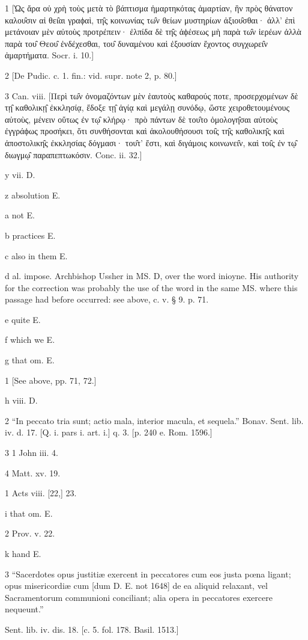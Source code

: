 1
[Ὡς ἄρα οὐ χρὴ τοὺς μετὰ τὸ βάπτισμα ἡμαρτηκότας ἁμαρτίαν, ἣν πρὸς θάνατον καλου̑σιν αἱ θει̑αι γραϕαὶ, τη̑ς κοινωνίας τω̑ν θείων μυστηρίων ἀξιου̑σθαι· ἀλλ’ ἐπὶ μετάνοιαν μὲν αὐτοὺς προτρέπειν· ἐλπίδα δὲ τη̑ς ἀϕέσεως μὴ παρὰ τω̑ν ἱερέων ἀλλὰ παρὰ του̑ Θεου̑ ἐνδέχεσθαι, του̑ δυναμένου καὶ ἐξουσίαν ἔχοντος συγχωρει̑ν ἁμαρτήματα. Socr. i. 10.]

2
[De Pudic. c. 1. fin.: vid. supr. note 2, p. 80.]

3
Can. viii. [Περὶ τω̑ν ὀνομαζόντων μὲν ἑαυτοὺς καθαρούς ποτε, προσερχομένων δὲ τῃ̑ καθολικῃ̑ ἐκκλησίᾳ, ἔδοξε τῃ̑ ἁγίᾳ καὶ μεγάλῃ συνόδῳ, ὥστε χειροθετουμένους αὐτοὺς, μένειν οὕτως ἐν τῳ̑ κλήρῳ· πρὸ πάντων δὲ του̑το ὁμολογη̑σαι αὐτοὺς ἐγγράϕως προσήκει, ὅτι συνθήσονται καὶ ἀκολουθήσουσι τοι̑ς τη̑ς καθολικη̑ς καὶ ἀποστολικη̑ς ἐκκλησίας δόγμασι· του̑τ’ ἔστι, καὶ διγάμοις κοινωνει̑ν, καὶ τοι̑ς ἐν τῳ̑ διωγμῳ̑ παραπεπτωκόσιν. Conc. ii. 32.]

y
vii. D.

z
absolution E.

a
not E.

b
practices E.

c
also in them E.

d
al. impose. Archbishop Ussher in MS. D, over the word inioyne. His authority for the correction was probably the use of the word in the same MS. where this passage had before occurred: see above, c. v. § 9. p. 71.

e
quite E.

f
which we E.

g
that om. E.

1
[See above, pp. 71, 72.]

h
viii. D.

2
“In peccato tria sunt; actio mala, interior macula, et sequela.” Bonav. Sent. lib. iv. d. 17. [Q. i. pars i. art. i.] q. 3. [p. 240 e. Rom. 1596.]

3
1 John iii. 4.

4
Matt. xv. 19.

1
Acts viii. [22,] 23.

i
that om. E.

2
Prov. v. 22.

k
hand E.

3
“Sacerdotes opus justitiæ exercent in peccatores cum eos justa pœna ligant; opus misericordiæ cum [dum D. E. not 1648] de ea aliquid relaxant, vel Sacramentorum communioni conciliant; alia opera in peccatores exercere nequeunt.”

Sent. lib. iv. dis. 18. [c. 5. fol. 178. Basil. 1513.]

